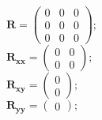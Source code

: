 \documentclass[11pt, oneside]{article}      %
\begin{document}
%
$ \mathbf{R} = \left(\begin{array}{ccc}0 & 0 & 0\\0 & 0 & 0\\0 & 0 & 0\end{array}\right) ; $ 
%
\\
%
$ \mathbf{R_{xx}} = \left(\begin{array}{cc}0 & 0\\0 & 0\end{array}\right) ; $ 
%
\\
%
$ \mathbf{R_{xy}} = \left(\begin{array}{c}0\\0\end{array}\right) ; $ 
%
\\
%
$ \mathbf{R_{yy}} = \left(\begin{array}{c}0\end{array}\right) ; $ 
%
\\
%
\end{document}

